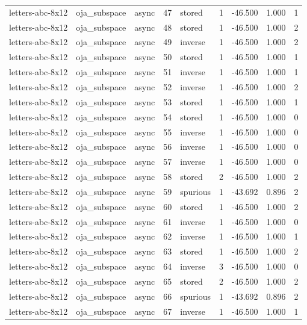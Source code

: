 \begin{tabular}{lllrlrrrr}
letters-abc-8x12 & oja\_subspace & async & 47 & stored & 1 & -46.500 & 1.000 & 1 \\
letters-abc-8x12 & oja\_subspace & async & 48 & stored & 1 & -46.500 & 1.000 & 2 \\
letters-abc-8x12 & oja\_subspace & async & 49 & inverse & 1 & -46.500 & 1.000 & 2 \\
letters-abc-8x12 & oja\_subspace & async & 50 & stored & 1 & -46.500 & 1.000 & 1 \\
letters-abc-8x12 & oja\_subspace & async & 51 & inverse & 1 & -46.500 & 1.000 & 1 \\
letters-abc-8x12 & oja\_subspace & async & 52 & inverse & 1 & -46.500 & 1.000 & 2 \\
letters-abc-8x12 & oja\_subspace & async & 53 & stored & 1 & -46.500 & 1.000 & 1 \\
letters-abc-8x12 & oja\_subspace & async & 54 & stored & 1 & -46.500 & 1.000 & 0 \\
letters-abc-8x12 & oja\_subspace & async & 55 & inverse & 1 & -46.500 & 1.000 & 0 \\
letters-abc-8x12 & oja\_subspace & async & 56 & inverse & 1 & -46.500 & 1.000 & 0 \\
letters-abc-8x12 & oja\_subspace & async & 57 & inverse & 1 & -46.500 & 1.000 & 0 \\
letters-abc-8x12 & oja\_subspace & async & 58 & stored & 2 & -46.500 & 1.000 & 2 \\
letters-abc-8x12 & oja\_subspace & async & 59 & spurious & 1 & -43.692 & 0.896 & 2 \\
letters-abc-8x12 & oja\_subspace & async & 60 & stored & 1 & -46.500 & 1.000 & 2 \\
letters-abc-8x12 & oja\_subspace & async & 61 & inverse & 1 & -46.500 & 1.000 & 0 \\
letters-abc-8x12 & oja\_subspace & async & 62 & inverse & 1 & -46.500 & 1.000 & 1 \\
letters-abc-8x12 & oja\_subspace & async & 63 & stored & 1 & -46.500 & 1.000 & 2 \\
letters-abc-8x12 & oja\_subspace & async & 64 & inverse & 3 & -46.500 & 1.000 & 0 \\
letters-abc-8x12 & oja\_subspace & async & 65 & stored & 2 & -46.500 & 1.000 & 2 \\
letters-abc-8x12 & oja\_subspace & async & 66 & spurious & 1 & -43.692 & 0.896 & 2 \\
letters-abc-8x12 & oja\_subspace & async & 67 & inverse & 1 & -46.500 & 1.000 & 1 \\

\end{tabular}
